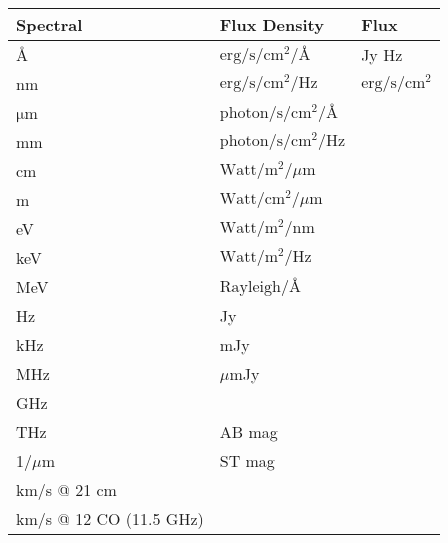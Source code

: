 \begin{table}
    \begin{tabular}{lll}
    \toprule
    Spectral                & Flux Density      & Flux      \\
    \midrule
    \mbox{\AA}              & $\mathrm{erg}/\mathrm{s}/\mathrm{cm}^{2}/\mbox{\AA}$     & Jy Hz     \\
    nm                      & $\mathrm{erg}/\mathrm{s}/\mathrm{cm}^{2}/\mathrm{Hz}$    & $\mathrm{erg}/\mathrm{s}/\mathrm{cm}^{2}$ \\
    $\mathrm{\mu}$m         & $\mathrm{photon}/\mathrm{s}/\mathrm{cm}^{2}/\mbox{\AA}$  & ~         \\
    mm                      & $\mathrm{photon}/\mathrm{s}/\mathrm{cm}^{2}/\mathrm{Hz}$ & ~         \\
    cm                      & $\mathrm{Watt}/\mathrm{m}^{2}/{\mu}\mathrm{m}$           & ~         \\
    m                       & $\mathrm{Watt}/\mathrm{cm}^{2}/\mu\mathrm{m}$            & ~         \\
    eV                      & $\mathrm{Watt}/\mathrm{m}^{2}/\mathrm{nm}$               & ~         \\
    keV                     & $\mathrm{Watt}/\mathrm{m}^{2}/\mathrm{Hz}$               & ~         \\
    MeV                     & $\mathrm{Rayleigh}/\mbox{\AA}$                           & ~         \\
    Hz                      & Jy                									   & ~         \\
    kHz                     & mJy               									   & ~         \\
    MHz                     & ${\mu}$mJy             								   & ~         \\
    GHz                     & ~                 									   & ~         \\
    THz                     & AB mag           										   & ~         \\
    1/${\mu}$m              & ST mag             									   & ~         \\
    km/s @ 21 cm            & ~               										   & ~         \\
    km/s @ 12 CO (11.5 GHz) & ~             									 	   & ~         \\
    \bottomrule
    \end{tabular}
\end{table}